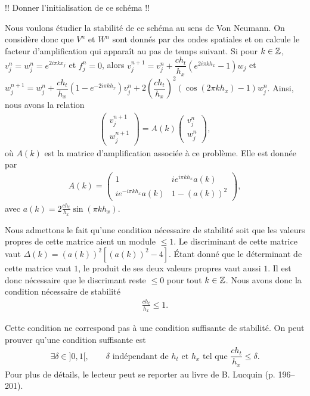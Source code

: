 \documentclass[12pt,a4paper,twoside]{article}
\begin{document}
!! Donner l'initialisation de ce sch\'ema !!


Nous voulons \'etudier la stabilit\'e de ce sch\'ema au sens de Von Neumann.
On consid\`ere donc que $V^n$ et $W^n$ sont donn\'es par des ondes spatiales et
on calcule le facteur d'amplification qui appara\^it au pas de temps suivant.
Si pour $k \in \mathbb{Z}$, $v_j^n = w_j^n = e^{2 i \pi k x_j}$ et $f_j^n = 0$, alors
$v_j^{n+1} = v_j^n + \dfrac{c h_t}{h_x} ( e^{2 i \pi k h_x} - 1 ) w_j$
et $w_j^{n+1} = w_j^n + \dfrac{c h_t}{h_x} (1-e^{-2 i \pi k h_x}) v_j^n
+ 2 \left(\dfrac{c h_t}{h_x}\right)^2 (\cos(2 \pi k h_x) - 1) w_j^n$.
Ainsi, nous avons la relation
\begin{align*}
  \begin{pmatrix}
    v_j^{n+1} \\ w_j^{n+1}
  \end{pmatrix}
  = A(k)
  \begin{pmatrix}
    v_j^{n} \\ w_j^{n}
  \end{pmatrix} ,
\end{align*}
o\`u $A(k)$ est la matrice d'amplification associ\'ee \`a ce probl\`eme.
Elle est donn\'ee par
\begin{align*}
  A(k) = 
  \begin{pmatrix}
    1 & i e^{i \pi k h_x} a(k)
    \\
    i e^{-i \pi k h_x} a(k) & 1 - (a(k))^2
  \end{pmatrix} ,
\end{align*}
avec $a(k) = 2 \frac{c h_t}{h_x} \sin(\pi k h_x)$.


Nous admettons le fait qu'une condition n\'ecessaire de stabilit\'e soit
que les valeurs propres de cette matrice aient un module $\leq 1$.
Le discriminant de cette matrice vaut
$\Delta(k) = (a(k))^2 [(a(k))^2 - 4]$.
\'Etant donn\'e que le d\'eterminant de cette matrice vaut $1$,
le produit de ses deux valeurs propres vaut aussi $1$.
Il est donc n\'ecessaire que le discrimant reste $\leq 0$ pour tout $k \in \mathbb{Z}$.
Nous avons donc la condition n\'ecessaire de stabilit\'e
\begin{align*}
  \frac{c h_t}{h_x} \leq 1 .
\end{align*}


Cette condition ne correspond pas \`a une condition suffisante de stabilit\'e.
On peut prouver qu'une condition suffisante est
\begin{align*}
  \exists \delta \in ]0,1[, \qquad
  \text{$\delta$ ind\'ependant de $h_t$ et $h_x$ tel que  }
  \dfrac{c h_t}{h_x} \leq \delta .
\end{align*}
Pour plus de d\'etails, le lecteur peut se reporter au livre de B. Lucquin
(p. 196--201).
\end{document}
